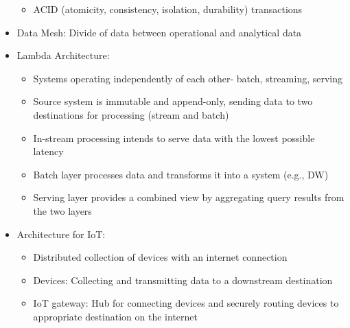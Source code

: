 \documentclass[11pt]{scrartcl}
\begin{document}
\begin{itemize}
\begin{itemize}
		\item ACID (atomicity, consistency, isolation, durability) transactions
	\end{itemize}
	\item Data Mesh: Divide of data between operational and analytical data
	\item Lambda Architecture:
	\begin{itemize}
		\item Systems operating independently of each other- batch, streaming, serving
		\item Source system is immutable and append-only, sending data to two destinations for processing (stream and batch)
		\item In-stream processing intends to serve data with the lowest possible latency
		\item Batch layer processes data and transforms it into a system (e.g., DW)
		\item Serving layer provides a combined view by aggregating query results from the two layers
	\end{itemize}
	\item Architecture for IoT:
	\begin{itemize}
		\item Distributed collection of devices with an internet connection
		\item Devices: Collecting and transmitting data to a downstream destination
		\item IoT gateway: Hub for connecting devices and securely routing devices to appropriate destination on the internet
	\end{itemize}
\end{itemize}
\end{document}
